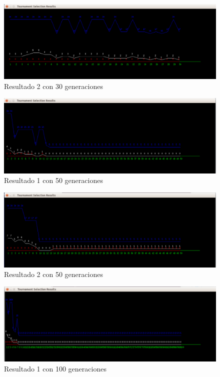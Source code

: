 \documentclass[11pt,letterpaper]{article}
\begin{document}
\begin{figure}[H]
	\centering
	\includegraphics[scale = 0.4]{images/30gen2}
	\caption{Resultado 2 con 30 generaciones}
\end{figure}

\begin{figure}[H]
	\centering
	\includegraphics[scale = 0.4]{images/50gen1}
	\caption{Resultado 1 con 50 generaciones}
\end{figure}

\begin{figure}[H]
	\centering
	\includegraphics[scale = 0.4]{images/50gen2}
	\caption{Resultado 2 con 50 generaciones}
\end{figure}

\begin{figure}[H]
	\centering
	\includegraphics[scale = 0.4]{images/100gen1}
	\caption{Resultado 1 con 100 generaciones}
\end{figure}
\end{document}
